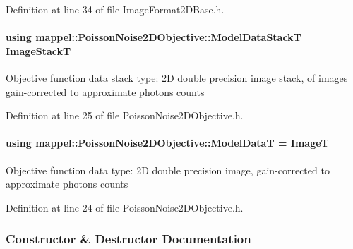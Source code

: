 Definition at line 34 of file Image\+Format2\+D\+Base.\+h.

\paragraph[{\texorpdfstring{Model\+Data\+StackT}{ModelDataStackT}}]{\setlength{\rightskip}{0pt plus 5cm}using {\bf mappel\+::\+Poisson\+Noise2\+D\+Objective\+::\+Model\+Data\+StackT} =  {\bf Image\+StackT}}\hypertarget{classmappel_1_1PoissonNoise2DObjective_a889b543eb0ba9494f749a4d1b17b59b4}{}\label{classmappel_1_1PoissonNoise2DObjective_a889b543eb0ba9494f749a4d1b17b59b4}
Objective function data stack type\+: 2D double precision image stack, of images gain-\/corrected to approximate photons counts 

Definition at line 25 of file Poisson\+Noise2\+D\+Objective.\+h.

\paragraph[{\texorpdfstring{Model\+DataT}{ModelDataT}}]{\setlength{\rightskip}{0pt plus 5cm}using {\bf mappel\+::\+Poisson\+Noise2\+D\+Objective\+::\+Model\+DataT} =  {\bf ImageT}}\hypertarget{classmappel_1_1PoissonNoise2DObjective_afe2da04c65d68529e79e41002d4f7827}{}\label{classmappel_1_1PoissonNoise2DObjective_afe2da04c65d68529e79e41002d4f7827}
Objective function data type\+: 2D double precision image, gain-\/corrected to approximate photons counts 

Definition at line 24 of file Poisson\+Noise2\+D\+Objective.\+h.



\subsubsection{Constructor \& Destructor Documentation}
